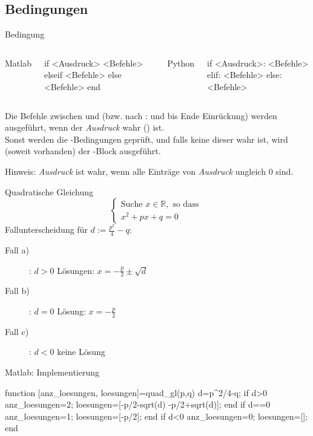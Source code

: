 \documentclass[hyperref={xetex}]{beamer}
\begin{document}
\subsection{Bedingungen}
%
%
%
\begin{frame}[fragile]{Bedingung}
\begin{columns}[t,onlytextwidth]
Matlab
\begin{matlabin}
if  <Ausdruck>
   <Befehle>
elseif
  <Befehle>
else
   <Befehle>
end
\end{matlabin}
Python
\begin{pyin}
if <Ausdruck>:
  <Befehle>
elif:
  <Befehle>
else:
  <Befehle>
\end{pyin}
\end{columns}
  \begin{pyin}
\end{pyin}

Die Befehle zwischen  und  (bzw. nach : und bis Ende Einrückung) werden ausgeführt, wenn
der \textit{Ausdruck} wahr () ist.\\
Sonst werden die -Bedingungen geprüft, und falls keine dieser wahr ist, wird (soweit vorhanden) der -Block ausgeführt.

\alert{Hinweis}: \textit{Ausdruck} ist wahr, wenn   alle Einträge von \textit{Ausdruck} ungleich $0$ sind.
\end{frame}
%
%
%
\begin{frame}[fragile]{Quadratische Gleichung}
\alert{ \[  \left\{ \begin{array}{l} \mbox{Suche }  x \in \mathbb{R},
 \mbox{ so dass } \\
 x^2+px +q =0  \end{array} \right. \]}
Fallunterscheidung für $d:=\frac{p^2}{4} -q$:
\begin{description}
\item [Fall a)]: \alert{ $d>0$}  Lösungen: $x=-\frac{p}{2} \pm \sqrt{d}$ \\
\item [Fall b)]: \alert{ $d=0$}  Lösung: $x=-\frac{p}{2}$\\
\item [Fall c)]: \alert{ $d<0$} \quad keine Lösung
\end{description}
\end{frame} 
%
%
%
\begin{frame}[fragile]{Matlab: Implementierung}
\begin{matlabin}
function [anz_loesungen, loesungen]=quad_gl(p,q)
d=p^2/4-q; %
if d>0 
    anz_loesungen=2;
    loesungen=[-p/2-sqrt(d) -p/2+sqrt(d)];
end
if d==0 
    anz_loesungen=1;
    loesungen=[-p/2];
end
if d<0 
    anz_loesungen=0;
    loesungen=[];
end
\end{matlabin}
\end{frame}
\end{document}
